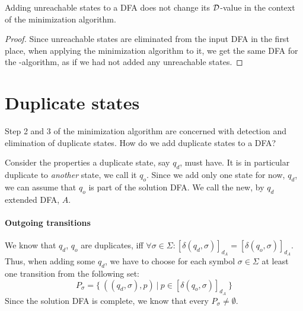 \begin{lemma}
	Adding unreachable states to a DFA does not change its $\mathcal{D}$-value in the context of the minimization algorithm.
\end{lemma}
\begin{proof}
	Since unreachable states are eliminated from the input DFA in the first place, when applying the minimization algorithm to it, we get the same DFA for the \MinMark-algorithm, as if we had not added any unreachable states.
\end{proof}

\section{Duplicate states}


Step 2 and 3 of the minimization algorithm are concerned with detection and elimination of duplicate states. How do we add duplicate states to a DFA?

Consider the properties a duplicate state, say $q_d$, must have. It is in particular duplicate to \emph{another} state, we call it $q_o$. Since we add only one state for now, $q_d$, we can assume that $q_o$ is part of the solution DFA. We call the new, by $q_d$ extended DFA, $A$.

\paragraph*{Outgoing transitions}

We know that $q_d$, $q_o$ are duplicates, iff $\forall \sigma \in \Sigma \colon [\delta(q_d, \sigma)]_{d_A} = [\delta(q_o, \sigma)]_{d_A}$. Thus, when adding some $q_d$, we have to choose for each symbol $\sigma \in \Sigma$ at least one transition from the following set:
\[
	P_\sigma = \{\ ((q_d, \sigma), p)\ |\ p \in [\delta(q_o, \sigma)]_{d_A}\ \}
\]
Since the solution DFA is complete, we know that every $P_\sigma \neq \emptyset$.


